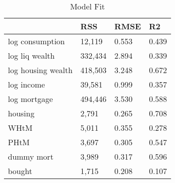 \begin{table}[htbp]
\caption{\label{clabel} Model Fit}\centering\medskip
\begin{tabular}{llll} \hline \hline
 & RSS  & RMSE  & R2  \\  \hline 
log consumption &    12,119 &     0.553 &     0.439 \\  
log liq wealth &   332,434 &     2.894 &     0.339 \\  
log housing wealth &   418,503 &     3.248 &     0.672 \\  
log income &    39,581 &     0.999 &     0.357 \\  
log mortgage &   494,446 &     3.530 &     0.588 \\  
housing &     2,791 &     0.265 &     0.708 \\  
WHtM &     5,011 &     0.355 &     0.278 \\  
PHtM &     3,697 &     0.305 &     0.547 \\  
dummy mort &     3,989 &     0.317 &     0.596 \\  
bought &     1,715 &     0.208 &     0.107 \\  
\hline \hline \end{tabular}
\end{table}
